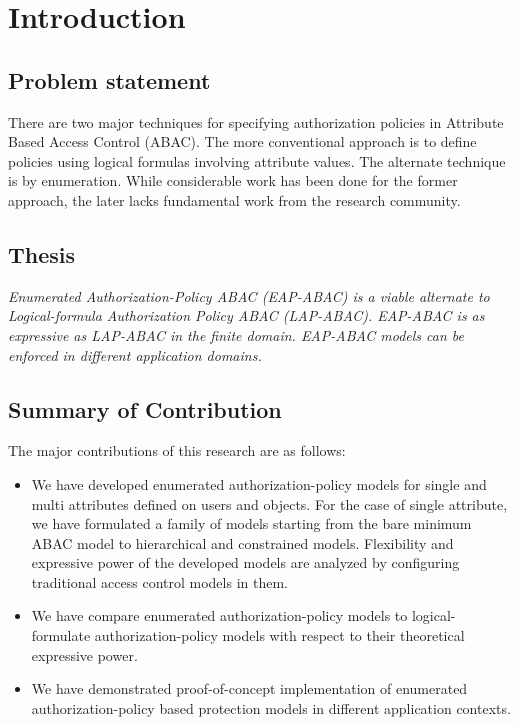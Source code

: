 \chapter{Introduction}










\section{Problem statement}
There are two major techniques for specifying authorization policies in Attribute Based Access Control (ABAC). The more conventional approach is to define policies using logical formulas involving attribute values. The alternate technique is by enumeration. While considerable work has been done for the former approach, the later  lacks fundamental work from the research community.

\section{Thesis}
\textit{Enumerated Authorization-Policy ABAC (EAP-ABAC) is a viable alternate to Logical-formula Authorization Policy ABAC (LAP-ABAC). EAP-ABAC is as expressive as LAP-ABAC in the finite domain. EAP-ABAC models can be enforced in different application domains.}


\section{Summary of Contribution}
The major contributions of this research are as follows:

\begin{itemize}
	\item We have developed enumerated authorization-policy models for single and multi attributes defined on users and objects. For the case of single attribute, we have formulated a family of models starting from the bare minimum ABAC model to hierarchical and constrained models. Flexibility and expressive power of the developed models are analyzed by configuring traditional access control models in them.
	
	\item   We have compare  enumerated authorization-policy models to logical-formulate authorization-policy models with respect to their theoretical expressive power.
	
	\item We have demonstrated proof-of-concept implementation of  enumerated authorization-policy based protection models in different application contexts.
\end{itemize}

